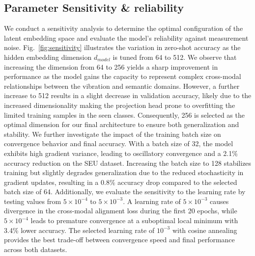 \subsection{Parameter Sensitivity & reliability}
We conduct a sensitivity analysis to determine the optimal configuration of the latent embedding space and evaluate the model's reliability against measurement noise. Fig.~\ref{fig:sensitivity} illustrates the variation in zero-shot accuracy as the hidden embedding dimension $d_{model}$ is tuned from 64 to 512. We observe that increasing the dimension from 64 to 256 yields a sharp improvement in performance as the model gains the capacity to represent complex cross-modal relationships between the vibration and semantic domains. However, a further increase to 512 results in a slight decrease in validation accuracy, likely due to the increased dimensionality making the projection head prone to overfitting the limited training samples in the seen classes. Consequently, 256 is selected as the optimal dimension for our final architecture to ensure both generalization and stability. We further investigate the impact of the training batch size on convergence behavior and final accuracy. With a batch size of 32, the model exhibits high gradient variance, leading to oscillatory convergence and a 2.1\% accuracy reduction on the SEU dataset. Increasing the batch size to 128 stabilizes training but slightly degrades generalization due to the reduced stochasticity in gradient updates, resulting in a 0.8\% accuracy drop compared to the selected batch size of 64. Additionally, we evaluate the sensitivity to the learning rate by testing values from $5 \times 10^{-4}$ to $5 \times 10^{-3}$. A learning rate of $5 \times 10^{-3}$ causes divergence in the cross-modal alignment loss during the first 20 epochs, while $5 \times 10^{-4}$ leads to premature convergence at a suboptimal local minimum with 3.4\% lower accuracy. The selected learning rate of $10^{-3}$ with cosine annealing provides the best trade-off between convergence speed and final performance across both datasets.

